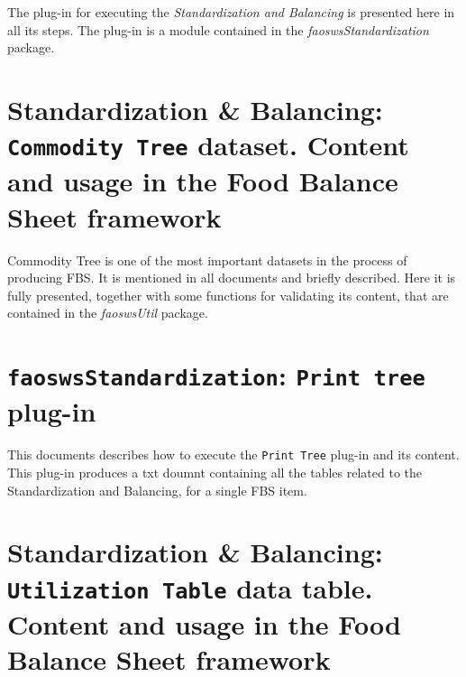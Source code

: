 \documentclass[]{article}
\begin{document}
The plug-in for executing the \emph{Standardization and Balancing} is
presented here in all its steps. The plug-in is a module contained in
the \emph{faoswsStandardization} package.

\section{\texorpdfstring{Standardization \& Balancing:
\texttt{Commodity\ Tree} dataset. Content and usage in the Food Balance
Sheet
framework}{Standardization \& Balancing: Commodity Tree dataset. Content and usage in the Food Balance Sheet framework}}\label{standardization-balancing-commodity-tree-dataset.-content-and-usage-in-the-food-balance-sheet-framework}

Commodity Tree is one of the most important datasets in the process of
producing FBS. It is mentioned in all documents and briefly described.
Here it is fully presented, together with some functions for validating
its content, that are contained in the \emph{faoswsUtil} package.

\section{\texorpdfstring{\texttt{faoswsStandardization}:
\texttt{Print\ tree}
plug-in}{faoswsStandardization: Print tree plug-in}}\label{faoswsstandardization-print-tree-plug-in}

This documents describes how to execute the \texttt{Print\ Tree} plug-in
and its content. This plug-in produces a txt doumnt containing all the
tables related to the Standardization and Balancing, for a single FBS
item.

\section{\texorpdfstring{Standardization \& Balancing:
\texttt{Utilization\ Table} data table. Content and usage in the Food
Balance Sheet
framework}{Standardization \& Balancing: Utilization Table data table. Content and usage in the Food Balance Sheet framework}}\label{standardization-balancing-utilization-table-data-table.-content-and-usage-in-the-food-balance-sheet-framework}
\end{document}
